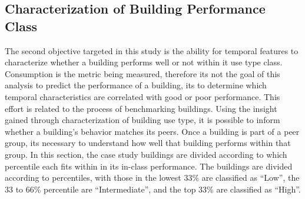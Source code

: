 \subsection{Characterization of Building Performance Class}
\label{sec:results_benchmarking}

The second objective targeted in this study is the ability for temporal features to characterize whether a building performs well or not within it use type class. Consumption is the metric being measured, therefore its not the goal of this analysis to predict the performance of a building, its to determine which temporal characteristics are correlated with good or poor performance. This effort is related to the process of benchmarking buildings. Using the insight gained through characterization of building use type, it is possible to inform whether a building's behavior matches its peers. Once a building is part of a peer group, its necessary to understand how well that building performs within that group. In this section, the case study buildings are divided according to which percentile each fits within in its in-class performance. The buildings are divided according to percentiles, with those in the lowest 33\% are classified as “Low”, the 33 to 66\% percentile are “Intermediate”, and the top 33\% are classified as “High”. 




